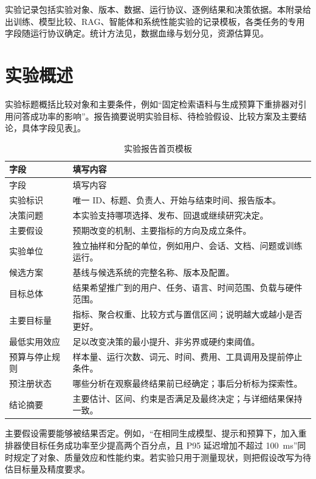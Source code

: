\documentclass[../workbook.tex]{subfiles}
\begin{document}
\fi
{}

实验记录包括实验对象、版本、数据、运行协议、逐例结果和决策依据。本附录给出训练、模型比较、RAG、智能体和系统性能实验的记录模板，各类任务的专用字段随运行协议确定。统计方法见，数据血缘与划分见，资源估算见。

\section{实验概述}

实验标题概括比较对象和主要条件，例如“固定检索语料与生成预算下重排器对引用问答成功率的影响”。报告摘要说明实验目标、待检验假设、比较方案及主要结论，具体字段见表\ref{tab:appendix-report-overview}。

\begin{longtable}{@{}p{.24\linewidth}p{.67\linewidth}@{}}
\caption{实验报告首页模板}\label{tab:appendix-report-overview}\\
\toprule
字段 & 填写内容\\\midrule
\endfirsthead
\toprule
字段 & 填写内容\\\midrule
\endhead
实验标识 & 唯一 ID、标题、负责人、开始与结束时间、报告版本。\\
决策问题 & 本实验支持哪项选择、发布、回退或继续研究决定。\\
主要假设 & 预期改变的机制、主要指标的方向及成立条件。\\
实验单位 & 独立抽样和分配的单位，例如用户、会话、文档、问题或训练运行。\\
候选方案 & 基线与候选系统的完整名称、版本及配置。\\
目标总体 & 结果希望推广到的用户、任务、语言、时间范围、负载与硬件范围。\\
主要目标量 & 指标、聚合权重、比较方式与置信区间；说明越大或越小是否更好。\\
最低实用效应 & 足以改变决策的最小提升、非劣界或硬约束阈值。\\
预算与停止规则 & 样本量、运行次数、词元、时间、费用、工具调用及提前停止条件。\\
预注册状态 & 哪些分析在观察最终结果前已经确定；事后分析标为探索性。\\
结论摘要 & 主要估计、区间、约束是否满足及最终决定；与详细结果保持一致。\\
\bottomrule
\end{longtable}

主要假设需要能够被结果否定。例如，“在相同生成模型、提示和预算下，加入重排器使目标任务成功率至少提高两个百分点，且 P95 延迟增加不超过 \SI{100}{\milli\second}”同时规定了对象、质量效应和性能约束。若实验只用于测量现状，则把假设改写为待估目标量及精度要求。
\end{document}
